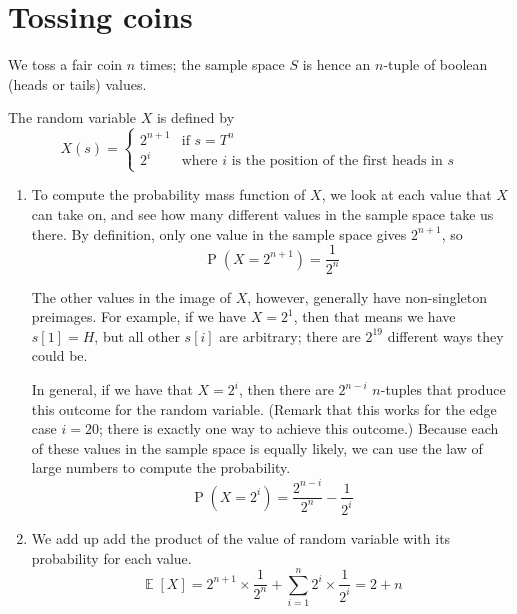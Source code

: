 \documentclass[11pt,letterpaper]{article}
\newcommand{\question}{\section}
\newcommand{\parens}[1]{\left(#1\right)}
\DeclareMathOperator{\Prob}{P}
\renewcommand{\P}[1]{\Prob{\parens{#1}}}
\DeclareMathOperator{\Expect}{\mathbb{E}}
\newcommand{\E}[1]{\Expect{\left[#1\right]}}
\begin{document}
\question{Tossing coins}

We toss a fair coin $n$ times; the sample space $S$ is hence an $n$-tuple of
boolean (heads or tails) values.

The random variable $X$ is defined by
\begin{equation*}
    X(s) = \begin{cases}
        2^{n+1} &\text{if $s = T^n$} \\
        2^i &\text{where $i$ is the position of the first heads in $s$}
    \end{cases}
\end{equation*}

\begin{enumerate}
    \item
        To compute the probability mass function of $X$, we look at each value
        that $X$ can take on, and see how many different values in the sample
        space take us there. By definition, only one value in the sample space
        gives $2^{n+1}$, so
        \begin{equation*}
            \P{X = 2^{n+1}} = \frac{1}{2^n}
        \end{equation*}

        The other values in the image of $X$, however, generally have
        non-singleton preimages. For example, if we have $X = 2^1$, then that
        means we have $s[1] = H$, but all other $s[i]$ are arbitrary; there are
        $2^{19}$ different ways they could be.

        In general, if we have that $X = 2^i$, then there are $2^{n-i}$
        $n$-tuples that produce this outcome for the random variable. (Remark
        that this works for the edge case $i = 20$; there is exactly one way to
        achieve this outcome.)
        Because each of these values in the sample space is equally likely, we
        can use the law of large numbers to compute the probability.
        \begin{equation*}
            \P{X = 2^i} = \frac{2^{n-i}}{2^n} - \frac{1}{2^i}
        \end{equation*}

    \item We add up add the product of the value of random variable with its
        probability for each value.
        \begin{equation*}
            \E{X}
            = 2^{n+1} \times \frac{1}{2^n}
            + \sum_{i=1}^n {2^i \times \frac{1}{2^i}} = 2 + n
        \end{equation*}
\end{enumerate}
\end{document}
